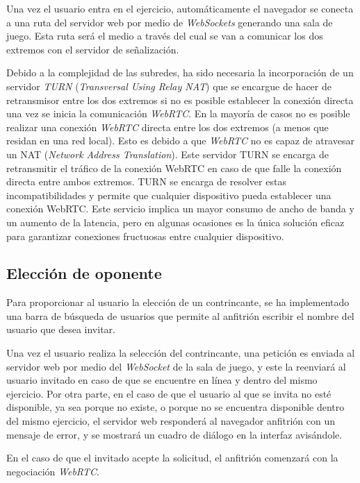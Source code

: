 \documentclass[a4paper, 12pt]{book}
\begin{document}
Una vez el usuario entra en el ejercicio, automáticamente el navegador se conecta a una ruta del servidor web por medio de \emph{WebSockets} generando una sala de juego. Esta ruta será el medio a través del cual se van a comunicar los dos extremos con el servidor de señalización.

Debido a la complejidad de las subredes, ha sido necesaria la incorporación de un servidor \emph{TURN} (\emph{Transversal Using Relay NAT}) que se encargue de hacer de retransmisor entre los dos extremos si no es posible establecer la conexión directa una vez se inicia la comunicación \emph{WebRTC}. En la mayoría de casos no es posible realizar una conexión \emph{WebRTC} directa entre los dos extremos (a menos que residan en una red local). Esto es debido a que \emph{WebRTC} no es capaz de atravesar un NAT (\emph{Network Address Translation}). Este servidor TURN se encarga de retransmitir el tráfico de la conexión WebRTC en caso de que falle la conexión directa entre ambos extremos. TURN se encarga de resolver estas incompatibilidades y permite que cualquier dispositivo pueda establecer una conexión WebRTC. Este servicio implica un mayor consumo de ancho de banda y un aumento de la latencia, pero en algunas ocasiones es la única solución eficaz para garantizar conexiones fructuosas entre cualquier dispositivo.

\subsection{Elección de oponente}
\label{sec:follow_line_game_sync_oponente_chat}

Para proporcionar al usuario la elección de un contrincante, se ha implementado una barra de búsqueda de usuarios que permite al anfitrión escribir el nombre del usuario que desea invitar.

Una vez el usuario realiza la selección del contrincante, una petición es enviada al servidor web por medio del \emph{WebSocket} de la sala de juego, y este la reenviará al usuario invitado en caso de que se encuentre en línea y dentro del mismo ejercicio. Por otra parte, en el caso de que el usuario al que se invita no esté disponible, ya sea porque no existe, o porque no se encuentra disponible dentro del mismo ejercicio, el servidor web responderá al navegador anfitrión con un mensaje de error, y se mostrará un cuadro de diálogo en la interfaz avisándole.

En el caso de que el invitado acepte la solicitud, el anfitrión comenzará con la negociación \emph{WebRTC}. 
\end{document}
